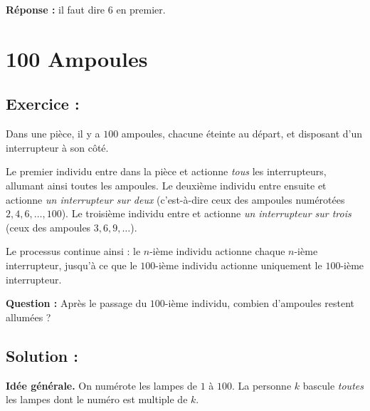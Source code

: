 \medskip
\noindent\textbf{Réponse :} il faut dire \(\boxed{6}\) en premier.


\section{100 Ampoules}

\subsection*{Exercice :}

\begin{exerciseBox}[100 Ampoules]
Dans une pièce, il y a $100$ ampoules, chacune éteinte au départ, et disposant d’un interrupteur à son côté.

Le premier individu entre dans la pièce et actionne \textit{tous} les interrupteurs, allumant ainsi toutes les ampoules.
Le deuxième individu entre ensuite et actionne \textit{un interrupteur sur deux} (c’est-à-dire ceux des ampoules numérotées $2, 4, 6, \ldots, 100$).  
Le troisième individu entre et actionne \textit{un interrupteur sur trois} (ceux des ampoules $3, 6, 9, \ldots$).  

Le processus continue ainsi : le $n$-ième individu actionne chaque $n$-ième interrupteur, jusqu’à ce que le $100$-ième individu actionne uniquement le $100$-ième interrupteur.

\medskip
\textbf{Question :} Après le passage du $100$-ième individu, combien d’ampoules restent allumées ?
\end{exerciseBox}

\subsection*{Solution :}


\textbf{Idée générale.} On numérote les lampes de $1$ à $100$. La personne $k$ bascule \emph{toutes} les lampes dont le numéro est multiple de $k$.

